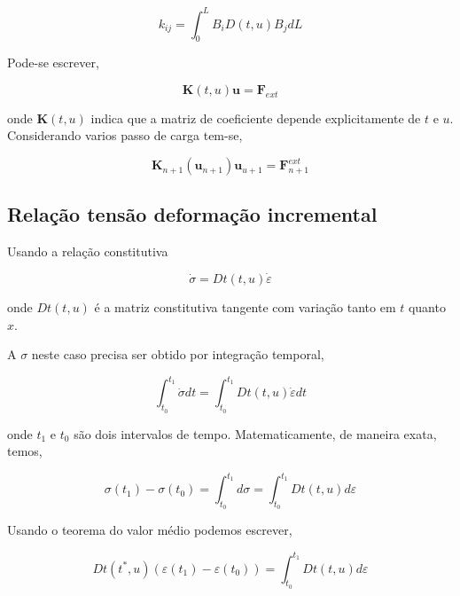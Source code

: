 \documentclass[12pt,a4paper]{article}
\newcommand{\diff}[1]{d#1}
\begin{document}
\begin{equation}
k_{ij} = \int_0^L B_i D\left(t,u\right) B_j \diff{L}
\end{equation}
 
Pode-se escrever,

\begin{equation}
\mathbf{K}(t, u) \mathbf{u} = \mathbf{F}_{ext}
\end{equation}

\noindent
onde $\mathbf{K}(t, u)$ indica que a matriz de coeficiente depende explicitamente de $t$ e $u$. Considerando varios passo de carga tem-se,

\begin{equation}
\mathbf{K}_{n+1}(\mathbf{u}_{n+1}) \mathbf{u}_{u+1} = \mathbf{F}^{ext}_{n+1}
\end{equation}
 
 
\subsection{Relação tensão deformação incremental}

Usando a relação constitutiva 

\begin{equation}
\dot{\sigma} = Dt\left(t,u\right) \dot{\varepsilon}  
\label{eq_t_defor_inc}
\end{equation}

\noindent
onde $Dt\left(t,u\right)$ é a matriz constitutiva tangente com variação tanto em $t$ quanto $x$.

A $\sigma$ neste caso precisa ser obtido por integração temporal,

\begin{equation}
\int_{t_0}^{t_1} \dot{\sigma} \diff{t} = \int_{t_0}^{t_1} Dt\left(t,u\right) \dot{\varepsilon} \diff{t} 
\end{equation}

\noindent
onde $t_1$ e $t_0$ são dois intervalos de tempo. Matematicamente, de maneira exata, temos, 
 
\begin{equation}
\sigma\left(t_1\right) - \sigma\left(t_0\right) = \int_{t_0}^{t_1} \diff{\sigma} = \int_{t_0}^{t_1} Dt\left(t,u\right) \diff{\varepsilon}
\end{equation}

Usando o teorema do valor médio podemos escrever, 
 
\begin{equation}
Dt\left(t^*,u\right)\left(\varepsilon(t_1) - \varepsilon(t_0)\right)  = \int_{t_0}^{t_1} Dt\left(t,u\right) \diff{\varepsilon}
\end{equation}
\end{document}
